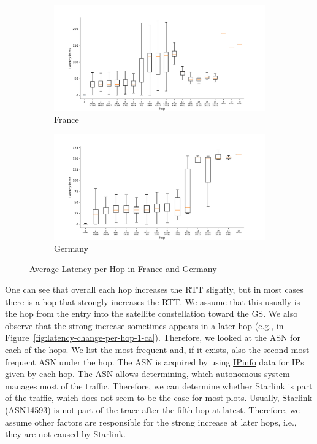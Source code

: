 \begin{figure}
	\centering
	\begin{subfigure}[b]{\linewidth}
		\includegraphics[width=\linewidth]{chapters/4-results/traceroute/img/latency-per-hop-FR-5001.pdf}
		\caption{France}
	\end{subfigure}
	\begin{subfigure}[b]{\linewidth}
		\includegraphics[width=\linewidth]{chapters/4-results/traceroute/img/latency-per-hop-DE-5001.pdf}
		\caption{Germany}
	\end{subfigure}
	\caption{Average Latency per Hop in France and Germany}
	\label{fig:latency-change-per-hop-2}
\end{figure}

One can see that overall each hop increases the RTT slightly, but in most cases
there is a hop that strongly increases the RTT. We assume that this usually is
the hop from the entry into the satellite constellation toward the \ac{GS}. We
also observe that the strong increase sometimes appears in a later hop (e.g.,
in Figure~\ref{fig:latency-change-per-hop-1-ca}). Therefore, we looked at the
\ac{ASN} for each of the hops. We list the most frequent and, if it exists,
also the second most frequent \ac{ASN} under the hop. The \ac{ASN} is acquired
by using \href{https://ipinfo.io/}{IPinfo} data for IPs given by each hop. The
\ac{ASN} allows determining, which autonomous system manages most of the
traffic. Therefore, we can determine whether Starlink is part of the traffic,
which does not seem to be the case for most plots. Usually, Starlink
(\ac{ASN}14593) is not part of the trace after the fifth hop at latest.
Therefore, we assume other factors are responsible for the strong increase at
later hops, i.e., they are not caused by Starlink.
